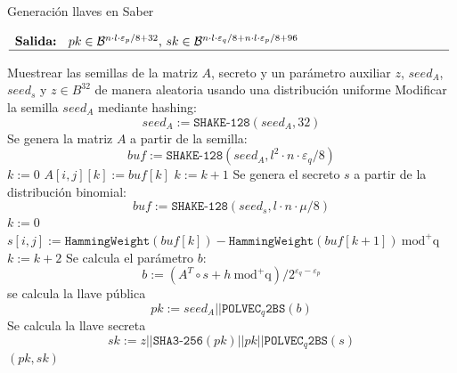 \begin{algorithm}[H]
	\small
	\caption{Generación llaves en Saber}
	$\begin{array}{p{\textwidth}}
		\textbf{Salida: } \(pk\in \mathcal{B}^{n\cdot l \cdot \varepsilon_p/8+32}\), \(sk\in \mathcal{B}^{n\cdot l \cdot \varepsilon_q/8+n\cdot l \cdot \varepsilon_p/8+96}\) \\ 
		\hline
	\end{array}$
	\begin{algorithmic}[1]
		\State Muestrear las semillas de la matriz \(A\), secreto y un parámetro auxiliar \(z\), \(seed_A\), \(seed_s\) y \(z\in B^{32}\) de manera aleatoria usando una distribución uniforme
		\State Modificar la semilla \(seed_A\) mediante hashing:
		\begin{equation}
			seed_A:=\texttt{SHAKE-128}(seed_A,32)
		\end{equation}
		\State Se genera la matriz \(A\) a partir de la semilla:
		\begin{equation}
			buf:=\texttt{SHAKE-128}(seed_A,l^2\cdot n \cdot \varepsilon_q/8) 
		\end{equation}
		\Statex {}
		\State \(k:=0\)
				\State $A[i,j][k]:=buf[k]$
				\State $k:=k+1$
				\EndFor
			\EndFor
		\EndFor
		\State Se genera el secreto \(s\) a partir de la distribución binomial:
		\begin{equation}
			buf:=\texttt{SHAKE-128}(seed_s,l\cdot n \cdot \mu/8) 
		\end{equation}
		\Statex {}
		\State \(k:=0\)
				\State $s[i,j]:=\texttt{HammingWeight}(buf[k])-\texttt{HammingWeight}(buf[k+1]) \ \text{mod}^{+}\text{q}$
				\State $k:=k+2$
			\EndFor
		\EndFor
		\State Se calcula el parámetro \(b\):
		\begin{equation}
			b:=\left(A^T\circ s + h  \ \text{mod}^{+}\text{q}\right) / 2^{\varepsilon_q-\varepsilon_p} 
		\end{equation}
		\State se calcula la llave pública
		\begin{equation}
			pk:=seed_A|| \texttt{POLVEC}_q\texttt{2BS}(b)
		\end{equation}
		\State Se calcula la llave secreta
		\begin{equation}
			sk:=z||\texttt{SHA3-256}(pk)||pk||\texttt{POLVEC}_q\texttt{2BS}(s)
		\end{equation}
		\State \Return $(pk,sk)$
	\end{algorithmic}
\end{algorithm}

